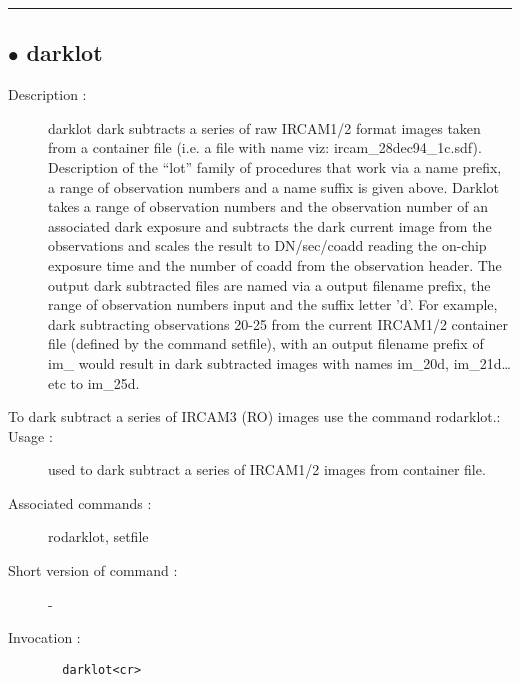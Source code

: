 \hrule \subsection*{$\bullet$ darklot}
\begin{description}
\item[Description :] darklot dark subtracts a series of raw {\sc IRCAM1/2} format images
taken from a container file (i.e. a file with name viz:
ircam\_28dec94\_1c.sdf).  Description of the ``lot'' family of procedures
that work via a name prefix, a range of observation numbers and a name
suffix is given above.  Darklot takes a range of observation numbers and
the observation number of an associated dark exposure and subtracts the
dark current image from the observations and scales the result to
DN/sec/coadd reading the on-chip exposure time and the number of coadd
from the observation header.  The output dark subtracted files are named
via a output filename prefix, the range of observation numbers input and
the suffix letter 'd'.  For example, dark subtracting observations 20-25
from the current {\sc IRCAM1/2} container file (defined by the command
setfile), with an output filename prefix of im\_ would result in dark
subtracted images with names im\_20d, im\_21d\ldots  etc to im\_25d.
\item[To dark subtract a series of {\sc IRCAM3} (RO) images use the command
rodarklot.:]
\item[Usage :] used to dark subtract a series of {\sc IRCAM1/2} images from container
file.
\item[Associated commands :] rodarklot, setfile
\item[Short version of command :] -
\item[Invocation :]

\verb+  darklot<cr> +\end{description}

